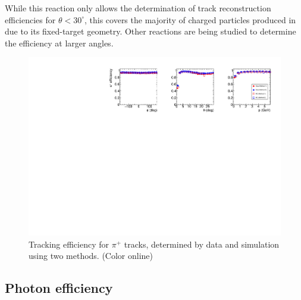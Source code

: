 While this reaction only allows the determination of track reconstruction efficiencies for $\theta < 30^\circ$, this covers the majority of charged particles produced in \gx{} due to its fixed-target geometry.  Other reactions are being studied to determine the efficiency at larger angles.


\begin{figure}[tbp]
\begin{center}
\includegraphics[width=\textwidth]{figures/PiPlusEfficiency.pdf}
\caption{\label{fig:tracking efficiency}
Tracking efficiency for $\pi^+$ tracks, determined by data and simulation using two methods. (Color online)}
\end{center}
\end{figure}



\subsection{Photon efficiency\label{sec:perfneutral}}



